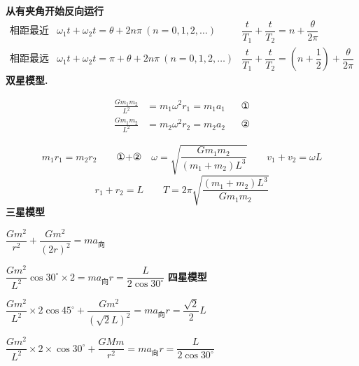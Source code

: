 \textbf{从有夹角开始反向运行}%
\[
\begin{array}{lll}
\text{相距最近} & \omega_1t+\omega_2t=\theta+2n\pi\ (n=0,1,2,\ldots) & \dfrac{t}{T_1}+\dfrac{t}{T_2}=n+\dfrac{\theta}{2\pi}\\[10pt]
\text{相距最远} & \omega_1t+\omega_2t=\pi+\theta+2n\pi\ (n=0,1,2,\ldots) & \dfrac{t}{T_1}+\dfrac{t}{T_2}=\left(n+\dfrac{1}{2}\right)+\dfrac{\theta}{2\pi}
\end{array}
\]
\textbf{双星模型.}


\begin{align*}
\frac{Gm_1m_2}{L^{2}}&=m_1\omega^{2}r_1=m_1a_1 &&\text{①}\\
\frac{Gm_1m_2}{L^{2}}&=m_2\omega^{2}r_2=m_2a_2 &&\text{②}
\end{align*}

\[
m_1r_1=m_2r_2\qquad \text{①+②}\quad \omega=\sqrt{\frac{Gm_1m_2}{(m_1+m_2)L^{3}}}\qquad v_1+v_2=\omega L
\]
\[
r_1+r_2=L\qquad T=2\pi\sqrt{\frac{(m_1+m_2)L^{3}}{Gm_1m_2}}
\]
\textbf{三星模型}


$\dfrac{Gm^{2}}{r^{2}}+\dfrac{Gm^{2}}{(2r)^{2}}=ma_{\text{向}}$


$\dfrac{Gm^{2}}{L^{2}}\cos30^{\circ}\times2=ma_{\text{向}}$\qquad $r=\dfrac{L}{2\cos30^{\circ}}$
\textbf{四星模型}


$\dfrac{Gm^{2}}{L^{2}}\times2\cos45^{\circ}+\dfrac{Gm^{2}}{(\sqrt{2}L)^{2}}=ma_{\text{向}}$\qquad $r=\dfrac{\sqrt{2}}{2}L$


$\dfrac{Gm^{2}}{L^{2}}\times2\times\cos30^{\circ}+\dfrac{GMm}{r^{2}}=ma_{\text{向}}$\qquad $r=\dfrac{L}{2\cos30^{\circ}}$
